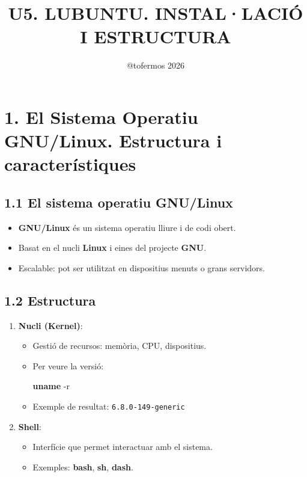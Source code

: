 \documentclass[
  catalan,
  a4paper,
]{article}
\title{U5. LUBUNTU. INSTAL·LACIÓ I ESTRUCTURA}
\author{@tofermos 2026}
\date{}
\newenvironment{Shaded}{\begin{snugshade}}{\end{snugshade}}
\newcommand{\AttributeTok}[1]{\textcolor[rgb]{0.13,0.29,0.53}{#1}}
\newcommand{\FunctionTok}[1]{\textcolor[rgb]{0.13,0.29,0.53}{\textbf{#1}}}
\providecommand{\tightlist}{%
  \setlength{\itemsep}{0pt}\setlength{\parskip}{0pt}}
\begin{document}
\maketitle

{
\setcounter{tocdepth}{2}
\tableofcontents
}
\newpage
\renewcommand\tablename{Tabla}

\section{1. El Sistema Operatiu GNU/Linux. Estructura i
característiques}\label{el-sistema-operatiu-gnulinux.-estructura-i-caracteruxedstiques}

\subsection{1.1 El sistema operatiu
GNU/Linux}\label{el-sistema-operatiu-gnulinux}

\begin{itemize}
\tightlist
\item
  \textbf{GNU/Linux} és un sistema operatiu lliure i de codi obert.
\item
  Basat en el nucli \textbf{Linux} i eines del projecte \textbf{GNU}.
\item
  Escalable: pot ser utilitzat en dispositius menuts o grans servidors.
\end{itemize}

\subsection{1.2 Estructura}\label{estructura}

\begin{enumerate}
\def\labelenumi{\arabic{enumi}.}
\tightlist
\item
  \textbf{Nucli (Kernel)}:

  \begin{itemize}
  \item
    Gestió de recursos: memòria, CPU, dispositius.
  \item
    Per veure la versió:

\begin{Shaded}
\begin{Highlighting}[]
\FunctionTok{uname} \AttributeTok{{-}r}
\end{Highlighting}
\end{Shaded}
  \item
    Exemple de resultat: \texttt{6.8.0-149-generic}
  \end{itemize}
\item
  \textbf{Shell}:

  \begin{itemize}
  \tightlist
  \item
    Interfície que permet interactuar amb el sistema.
  \item
    Exemples: \textbf{bash}, \textbf{sh}, \textbf{dash}.
  \end{itemize}
\end{enumerate}
\end{document}

